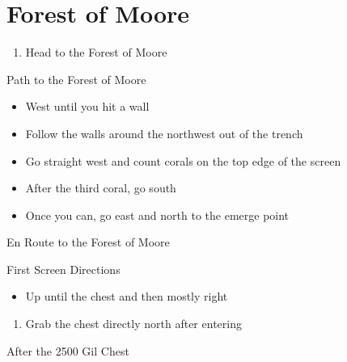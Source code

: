 \chapter{Forest of Moore}

\vspace{\baselineskip}

\begin{paracol}{2}

\begin{enumerate}
    \item Head to the Forest of Moore
\end{enumerate}

\begin{misc}{Path to the Forest of Moore}
    \begin{itemize}
        \item West until you hit a wall
        \item Follow the walls around the northwest out of the trench
        \item Go straight west and count corals on the top edge of the screen
        \item After the third coral, go south
        \item Once you can, go east and north to the emerge point
    \end{itemize}
\end{misc}

\switchcolumn
\begin{steproute}{En Route to the Forest of Moore}
\end{steproute}

\switchcolumn
\newpage
\begin{misc}{First Screen Directions}
    \begin{itemize}
        \item Up until the chest and then mostly right
    \end{itemize}
\end{misc}

\begin{enumerate}[resume]
    \item Grab the  chest directly north after entering
\end{enumerate}

\switchcolumn
\begin{steproute}{After the 2500 Gil Chest}
\end{steproute}


\end{paracol}
